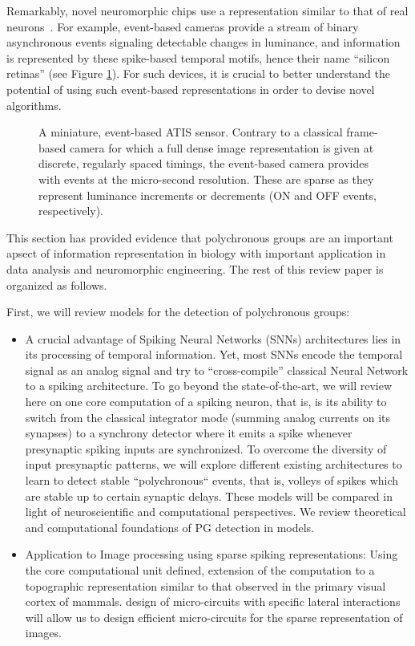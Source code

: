 \documentclass[brainsci, %
               review,submit,pdftex,moreauthors]{Definitions/mdpi}
\begin{document}
Remarkably, novel neuromorphic chips use a representation similar to that of real neurons~\citep{rasetto_challenges_2022}. For example, event-based cameras provide a stream of binary asynchronous events signaling detectable changes in luminance, and information is represented by these spike-based temporal motifs, hence their name ``silicon retinas'' (see Figure \ref{fig:silicon_retina}). For such devices, it is crucial to better understand the potential of using such event-based representations in order to devise novel algorithms.

\begin{figure}
\centering
\caption{A miniature, event-based ATIS sensor. Contrary to a classical frame-based camera for which a full dense image representation is given at discrete, regularly spaced timings, the event-based camera provides with events at the micro-second resolution. These are sparse as they represent luminance increments or decrements (ON and OFF events, respectively).}\label{fig:silicon_retina}
\end{figure}
This section has provided evidence that polychronous groups are an important apsect of information representation in biology with important application in data analysis and neuromorphic engineering. The rest of this review paper is organized as follows.

First, we will review models for the detection of polychronous groups:

\begin{itemize}
\item
  A crucial advantage of Spiking Neural Networks (SNNs) architectures lies in its processing of temporal information. Yet, most SNNs encode the temporal signal as an analog signal and try to ``cross-compile'' classical Neural Network to a spiking architecture. To go beyond the state-of-the-art, we will review here on one core computation of a spiking neuron, that is, is its ability to switch from the classical integrator mode (summing analog currents on its synapses) to a synchrony detector where it emits a spike whenever presynaptic spiking inputs are synchronized. To overcome the diversity of input presynaptic patterns, we will explore different existing architectures to learn to detect stable ``polychronous`` events, that is, volleys of spikes which are stable up to certain synaptic delays. These models will be compared in light of neuroscientific and computational perspectives. We review theoretical and computational foundations of PG detection in models.
\item
  Application to Image processing using sparse spiking representations: Using the core computational unit defined, extension of the computation to a topographic representation similar to that observed in the primary visual cortex of mammals. design of micro-circuits with specific lateral interactions will allow us to design efficient micro-circuits for the sparse representation of images.
\end{itemize}
\end{document}
